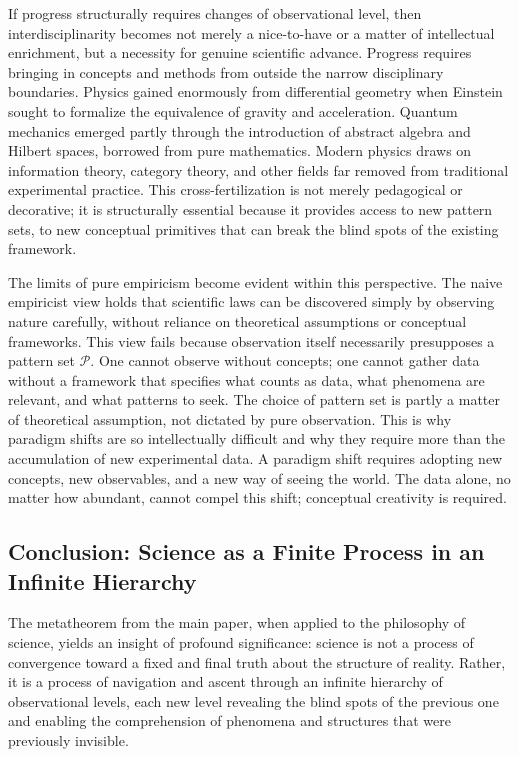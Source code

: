 \documentclass[11pt]{article}
\begin{document}
If progress structurally requires changes of observational level, then interdisciplinarity becomes not merely a nice-to-have or a matter of intellectual enrichment, but a necessity for genuine scientific advance. Progress requires bringing in concepts and methods from outside the narrow disciplinary boundaries. Physics gained enormously from differential geometry when Einstein sought to formalize the equivalence of gravity and acceleration. Quantum mechanics emerged partly through the introduction of abstract algebra and Hilbert spaces, borrowed from pure mathematics. Modern physics draws on information theory, category theory, and other fields far removed from traditional experimental practice. This cross-fertilization is not merely pedagogical or decorative; it is structurally essential because it provides access to new pattern sets, to new conceptual primitives that can break the blind spots of the existing framework.

The limits of pure empiricism become evident within this perspective. The naive empiricist view holds that scientific laws can be discovered simply by observing nature carefully, without reliance on theoretical assumptions or conceptual frameworks. This view fails because observation itself necessarily presupposes a pattern set $\mathcal{P}$. One cannot observe without concepts; one cannot gather data without a framework that specifies what counts as data, what phenomena are relevant, and what patterns to seek. The choice of pattern set is partly a matter of theoretical assumption, not dictated by pure observation. This is why paradigm shifts are so intellectually difficult and why they require more than the accumulation of new experimental data. A paradigm shift requires adopting new concepts, new observables, and a new way of seeing the world. The data alone, no matter how abundant, cannot compel this shift; conceptual creativity is required.


\subsection{Conclusion: Science as a Finite Process in an Infinite Hierarchy}
\label{subsec:conclusion_philosophy}

The metatheorem from the main paper, when applied to the philosophy of science, yields an insight of profound significance: science is not a process of convergence toward a fixed and final truth about the structure of reality. Rather, it is a process of navigation and ascent through an infinite hierarchy of observational levels, each new level revealing the blind spots of the previous one and enabling the comprehension of phenomena and structures that were previously invisible.
\end{document}
